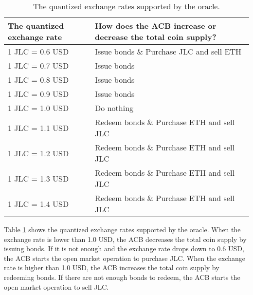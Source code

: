 \documentclass[dvipdfmx,a4paper]{article}
\begin{document}
\begin{table}[htb]
\begin{center}
\caption{The quantized exchange rates supported by the oracle.}\vspace{2ex}
\begin{tabular}{p{11em}|p{24em}}\hline
The quantized exchange rate & How does the ACB increase or decrease the total coin supply?\\\hline
1 JLC = 0.6 USD & Issue bonds \& Purchase JLC and sell ETH\\
1 JLC = 0.7 USD & Issue bonds\\
1 JLC = 0.8 USD & Issue bonds\\
1 JLC = 0.9 USD & Issue bonds\\
1 JLC = 1.0 USD & Do nothing\\
1 JLC = 1.1 USD & Redeem bonds \& Purchase ETH and sell JLC\\
1 JLC = 1.2 USD & Redeem bonds \& Purchase ETH and sell JLC\\
1 JLC = 1.3 USD & Redeem bonds \& Purchase ETH and sell JLC\\
1 JLC = 1.4 USD & Redeem bonds \& Purchase ETH and sell JLC\\\hline
\end{tabular}
\label{table1}
\end{center}
\end{table}

Table \ref{table1} shows the quantized exchange rates supported by the oracle. When the exchange rate is lower than 1.0 USD, the ACB decreases the total coin supply by issuing bonds. If it is not enough and the exchange rate drops down to 0.6 USD, the ACB starts the open market operation to purchase JLC. When the exchange rate is higher than 1.0 USD, the ACB increases the total coin supply by redeeming bonds. If there are not enough bonds to redeem, the ACB starts the open market operation to sell JLC.
\end{document}

